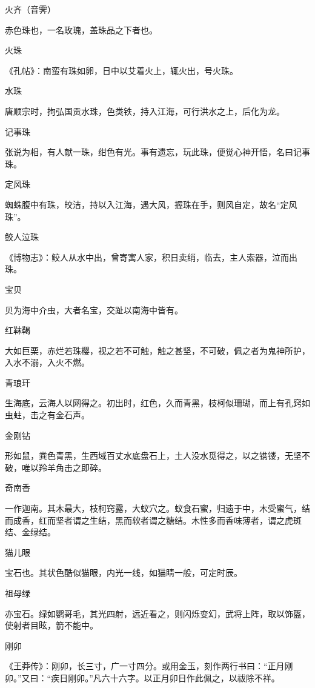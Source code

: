 \documentclass[a4paper,12pt,UTF8,twoside]{ctexbook}
\begin{document}
    火齐（音霁）
    
    赤色珠也，一名玫瑰，盖珠品之下者也。
    
    火珠
    
    《孔帖》：南蛮有珠如卵，日中以艾着火上，辄火出，号火珠。
    
    水珠
    
    唐顺宗时，拘弘国贡水珠，色类铁，持入江海，可行洪水之上，后化为龙。
    
    记事珠
    
    张说为相，有人献一珠，绀色有光。事有遗忘，玩此珠，便觉心神开悟，名曰记事珠。
    
    定风珠
    
    蜘蛛腹中有珠，皎洁，持以入江海，遇大风，握珠在手，则风自定，故名“定风珠”。
    
    鲛人泣珠
    
    《博物志》：鲛人从水中出，曾寄寓人家，积日卖绡，临去，主人索器，泣而出珠。
    
    宝贝
    
    贝为海中介虫，大者名宝，交趾以南海中皆有。
    
    红靺鞨
    
    大如巨栗，赤烂若珠樱，视之若不可触，触之甚坚，不可破，佩之者为鬼神所护，入水不溺，入火不燃。
    
    青琅玕
    
    生海底，云海人以网得之。初出时，红色，久而青黑，枝柯似珊瑚，而上有孔窍如虫蛀，击之有金石声。
    
    金刚钻
    
    形如鼠，粪色青黑，生西域百丈水底盘石上，土人没水觅得之，以之镌镂，无坚不破，唯以羚羊角击之即碎。
    
    奇南香
    
    一作迦南。其木最大，枝柯窍露，大蚁穴之。蚁食石蜜，归遗于中，木受蜜气，结而成香，红而坚者谓之生结，黑而软者谓之糖结。木性多而香味薄者，谓之虎斑结、金绿结。
    
    猫儿眼
    
    宝石也。其状色酷似猫眼，内光一线，如猫睛一般，可定时辰。
    
    祖母绿
    
    亦宝石。绿如鹦哥毛，其光四射，远近看之，则闪烁变幻，武将上阵，取以饰盔，使射者目眩，箭不能中。
    
    刚卯
    
    《王莽传》：刚卯，长三寸，广一寸四分。或用金玉，刻作两行书曰：“正月刚卯。”又曰：“疾日刚卯。”凡六十六字。以正月卯日作此佩之，以祓除不祥。
    
\end{document}
